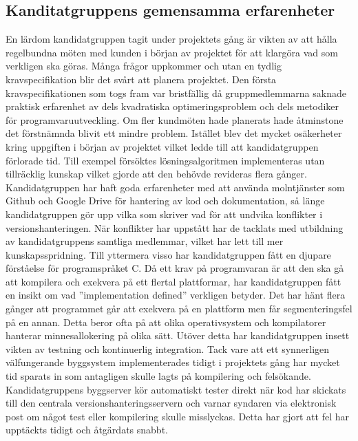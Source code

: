 	
\subsection{Kanditatgruppens gemensamma erfarenheter}
En lärdom kandidatgruppen tagit under projektets gång är vikten av att hålla regelbundna möten med kunden i början av projektet för att klargöra vad som verkligen ska göras. Många frågor uppkommer och utan en tydlig kravspecifikation blir det svårt att planera projektet. Den första kravspecifikationen som togs fram var bristfällig då gruppmedlemmarna saknade praktisk erfarenhet av dels kvadratiska optimeringsproblem och dels metodiker för programvaruutveckling. Om fler kundmöten hade planerats hade åtminstone det förstnämnda blivit ett mindre problem. Istället blev det mycket osäkerheter kring uppgiften i början av projektet vilket ledde till att kandidatgruppen förlorade tid. Till exempel försöktes lösningsalgoritmen implementeras utan tillräcklig kunskap vilket gjorde att den behövde revideras flera gånger.
\newline
\newline
Kandidatgruppen har haft goda erfarenheter med att använda molntjänster som Github och Google Drive för hantering av kod och dokumentation, så länge kandidatgruppen gör upp vilka som skriver vad för att undvika konflikter i versionshanteringen. När konflikter har uppstått har de tacklats med utbildning av kandidatgruppens samtliga medlemmar, vilket har lett till mer kunskapsspridning.
\newline
\newline
Till yttermera visso har kandidatgruppen fått en djupare förståelse för programspråket C. Då ett krav på programvaran är att den ska gå att kompilera och exekvera på ett flertal plattformar, har kandidatgruppen fått en insikt om vad ''implementation defined'' verkligen betyder. Det har hänt flera gånger att programmet går att exekvera på en plattform men får segmenteringsfel på en annan. Detta beror ofta på att olika operativsystem och kompilatorer hanterar minnesallokering på olika sätt.
\newline
\newline
Utöver detta har kandidatgruppen insett vikten av testning och kontinuerlig integration. Tack vare att ett synnerligen välfungerande byggsystem implementerades tidigt i projektets gång har mycket tid sparats in som antagligen skulle lagts på kompilering och felsökande. Kandidatgruppens byggserver kör automatiskt tester direkt när kod har skickats till den centrala versionshanteringsservern och varnar syndaren via elektronisk post om något test eller kompilering skulle misslyckas. Detta har gjort att fel har upptäckts tidigt och åtgärdats snabbt.

